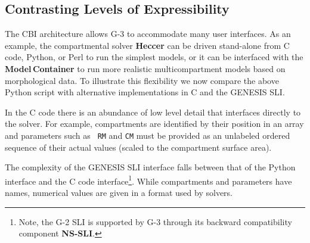 \documentclass[10pt]{article}
\begin{document}


\subsection*{Contrasting Levels of Expressibility}

The CBI architecture allows G-3 to accommodate many user
interfaces.  As an example, the compartmental solver {\bf Heccer} can be driven
stand-alone from C code, Python, or Perl to run the simplest
models, or it can be interfaced with the {\bf Model\,Container} to
run more realistic multicompartment models based on morphological
data. To illustrate this flexibility we now compare the above Python
script with alternative implementations in C and the GENESIS SLI.

In the C code there is an abundance of low level detail that
interfaces directly to the solver.  For example, compartments are
identified by their position in an array and parameters such as {\tt
  RM} and {\tt CM} must be provided as an unlabeled ordered sequence
of their actual values (scaled to the compartment surface area).

The complexity of the GENESIS SLI interface falls between that of the
Python interface and the C code interface\footnote{Note,
 the G-2 SLI is supported by G-3 through its backward compatibility
  component {\bf NS-SLI}.}.  While
compartments and parameters have names, numerical values are given in
a format used by solvers.
\end{document}
